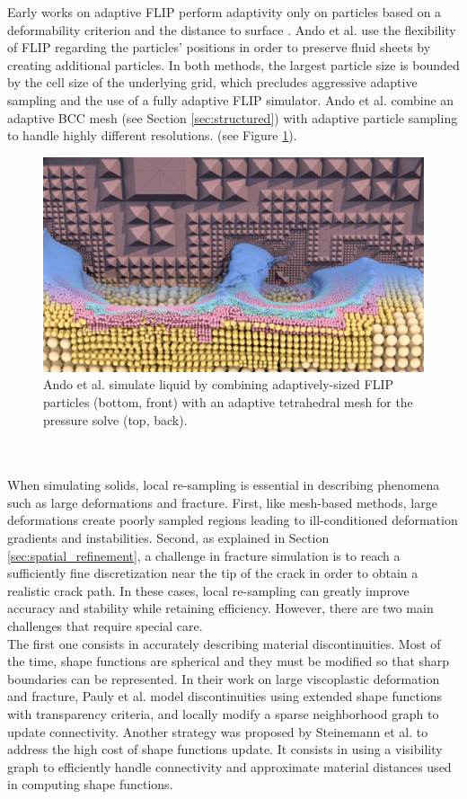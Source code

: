 Early works on adaptive FLIP perform adaptivity only on particles based on a deformability criterion and the distance to surface \cite{Hong2008FLIP, Ando2012}. Ando et al. use the flexibility of FLIP regarding the particles' positions in order to preserve fluid sheets by creating additional particles.
In both methods, the largest particle size is bounded by the cell size of the underlying grid, which precludes aggressive adaptive sampling and the use of a fully adaptive FLIP simulator. Ando et al. \cite{Ando2013} combine an adaptive BCC mesh (see Section \ref{sec:structured}) with adaptive particle sampling to handle highly different resolutions. (see Figure \ref{fig:Ando2013}).
\begin{figure}[t]
	\centering
	\includegraphics[width=0.8\linewidth]{images/starAdaptivity-cgf2016/Ando2013_3.png}
	\caption[STAR adaptivity: Hybrid refinement of meshes and particles]{Ando et al. \cite{Ando2013} simulate liquid by combining adaptively-sized FLIP particles (bottom, front) with an adaptive tetrahedral mesh for the pressure solve (top, back).}
	\label{fig:Ando2013}
\end{figure}
\\ \\
When simulating solids, local re-sampling is essential in describing phenomena such as large deformations and fracture. First, like mesh-based methods, large deformations create poorly sampled regions leading to ill-conditioned deformation gradients and instabilities. Second, as explained in Section \ref{sec:spatial_refinement}, a challenge in fracture simulation is to reach a sufficiently fine discretization near the tip of the crack in order to obtain a realistic crack path. In these cases, local re-sampling can greatly improve accuracy and stability while retaining efficiency. However, there are two main challenges that require special care.
\\
The first one consists in accurately describing material discontinuities. Most of the time, shape functions are spherical and they must be modified so that sharp boundaries can be represented. In their work on large viscoplastic deformation and fracture, Pauly et al. \cite{Pauly2005} model discontinuities using extended shape functions with transparency criteria, and locally modify a sparse neighborhood graph to update connectivity. Another strategy was proposed by Steinemann et al. \cite{Steinemann2009} to address the high cost of shape functions update. It consists in using a visibility graph to efficiently handle connectivity and approximate material distances used in computing shape functions.
